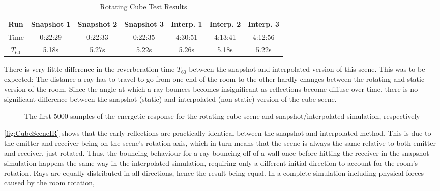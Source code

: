 \begin{table}[t!]
    \centering
    \begin{tabular}{| c | c | c | c | c | c | c |}
        \hline
        Run        & Snapshot 1 & Snapshot 2 & Snapshot 3 & Interp. 1 & Interp. 2 & Interp. 3 \\
        \hline
        Time       & 0:22:29    & 0:22:33    & 0:22:35    & 4:30:51   & 4:13:41   & 4:12:56   \\
        \hline
        \(T_{60}\) & 5.18s      & 5.27s      & 5.22s      & 5.26s     & 5.18s     & 5.22s     \\
        \hline
    \end{tabular}
    \caption{Rotating Cube Test Results}\label{tbl:CubeSceneTable}
\end{table}
There is very little difference in the reverberation time \(T_{60}\) between the snapshot and interpolated version of this scene.
This was to be expected:
The distance a ray has to travel to go from one end of the room to the other hardly changes between the rotating and static version of the room.
Since the angle at which a ray bounces becomes insignificant as reflections become diffuse over time,
there is no significant difference between the snapshot (static) and interpolated (non-static) version of the cube scene.
\newline
\begin{figure}[t!]
    \begin{center}
        
    \end{center}
    \caption{The first 5000 samples of the energetic response for the rotating cube scene and snapshot/interpolated simulation, respectively}\label{fig:CubeSceneIR}
\end{figure}
\autoref{fig:CubeSceneIR} shows that the early reflections are practically identical between the snapshot and interpolated method.
This is due to the emitter and receiver being on the scene's rotation axis,
which in turn means that the scene is always the same relative to both emitter and receiver, just rotated.
\newline
Thus, the bouncing behaviour for a ray bouncing off of a wall once before hitting the receiver
in the snapshot simulation happens the same way in the interpolated simulation,
requiring only a different initial direction to account for the room's rotation.
Rays are equally distributed in all directions, hence the result being equal.
\newline
In a complete simulation including physical forces caused by the room rotation,
